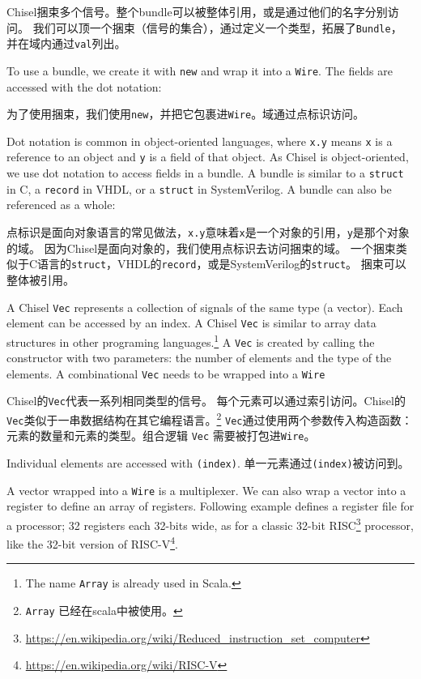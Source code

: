 \documentclass[%
    10pt,
    headinclude, footexclude,
    openright, %
    notitlepage,
    cleardoubleempty,
    headsepline,
    pointlessnumbers,
    bibtotoc, idxtotoc,
    ]{scrbook}
\newcommand{\code}[1]{{\small{\texttt{#1}}}}
\newcommand{\codefoot}[1]{{\footnotesize{\texttt{#1}}}}
\newcommand{\myref}[2]{\href{#1}{#2}}
\renewcommand{\myref}[2]{{#2}{\footnote{\url{#1}}}}
\begin{document}
Chisel捆束多个信号。整个bundle可以被整体引用，或是通过他们的名字分别访问。
我们可以顶一个捆束（信号的集合），通过定义一个类型，拓展了\code{Bundle}，
并在域内通过\code{val}列出。



\noindent To use a bundle, we create it with \code{new} and wrap it into a \code{Wire}.
The fields are accessed with the dot notation:

\noindent 为了使用捆束，我们使用\code{new}，并把它包裹进\code{Wire}。域通过点标识访问。



Dot notation is common in object-oriented languages, where \code{x.y} means
\code{x} is a reference to an object and \code{y} is a field of that object.
As Chisel is object-oriented, we use dot notation to access fields in a bundle.
A bundle is similar to a \code{struct} in C, a \code{record} in VHDL, or a
\code{struct} in SystemVerilog.
A bundle can also be referenced as a whole:

点标识是面向对象语言的常见做法，\code{x.y}意味着\code{x}是一个对象的引用，\code{y}是那个对象的域。
因为Chisel是面向对象的，我们使用点标识去访问捆束的域。
一个捆束类似于C语言的\code{struct}，VHDL的\code{record}，或是SystemVerilog的\code{struct}。
捆束可以整体被引用。


A Chisel \code{Vec} represents a collection of signals of the same type (a vector).
Each element can be accessed by an index. A Chisel \code{Vec} is similar
to array data structures in other programing languages.\footnote{The name \codefoot{Array}
is already used in Scala.}
A \code{Vec} is created by calling the constructor with two parameters: the
number of elements and the type of the elements. A combinational \code{Vec}
needs to be wrapped into a \code{Wire}

Chisel的\code{Vec}代表一系列相同类型的信号。
每个元素可以通过索引访问。Chisel的\code{Vec}类似于一串数据结构在其它编程语言。\footnote{ \codefoot{Array}
已经在scala中被使用。}
\code{Vec}通过使用两个参数传入构造函数：元素的数量和元素的类型。组合逻辑 \code{Vec}
需要被打包进\code{Wire}。


\noindent Individual elements are accessed with \code{(index)}.
\noindent 单一元素通过\code{(index)}被访问到。


A vector wrapped into a \code{Wire} is a multiplexer.
We can also wrap a vector into a register to define an array of registers.
Following example defines a register file for a processor; 32 registers
each 32-bits wide, as for a classic 32-bit 
\myref{https://en.wikipedia.org/wiki/Reduced_instruction_set_computer}{RISC}
processor, like the 32-bit version of \myref{https://en.wikipedia.org/wiki/RISC-V}{RISC-V}.
\end{document}
